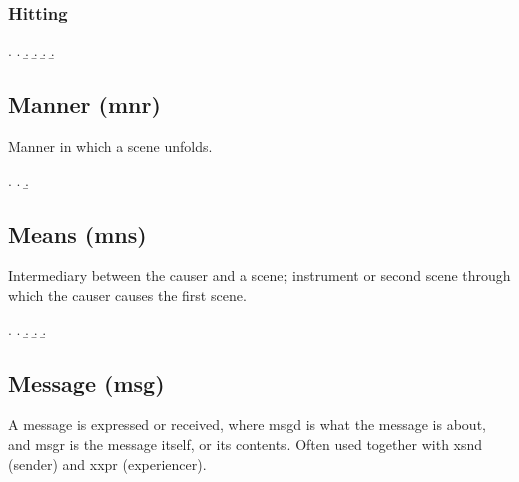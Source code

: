 \documentclass[a4paper]{article}
\begin{document}
\subsubsection{Hitting}

\ex.
\a. 
\b. 
\b. 
\b. 
\b. 


\clearpage
\subsection{Manner (\textsf{mnr})}
\label{sec:mnr}

Manner in which a scene unfolds.

\ex.
\a. 
\b. 


\clearpage
\subsection{Means (\textsf{mns})}
\label{sec:mns}

Intermediary between the causer and a scene; instrument or second scene through
which the causer causes the first scene.

\ex.
\a. 
\b. 
\b. 
\b. 


\clearpage
\subsection{Message (\textsf{msg})}
\label{sec:msg}

A message is expressed or received, where \textsf{msgd} is what the message is
about, and \textsf{msgr} is the message itself, or its contents. Often used
together with \textsf{xsnd} (sender) and \textsf{xxpr} (experiencer).
\end{document}
